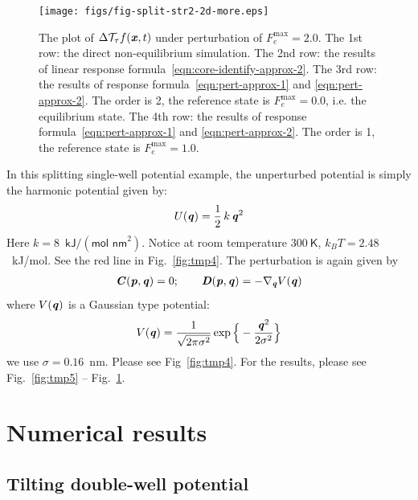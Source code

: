 \documentclass[aip,jcp,a4paper,reprint,onecolumn]{revtex4-1}
\newcommand{\vect}[1]{\textbf{\textit{#1}}}
\newcommand{\mt}{\mathcal T}
\begin{document}
\begin{figure}
  \centering
  \texttt{[image: figs/fig-split-str2-2d-more.eps]}
  \caption{The plot of $\Delta\mt_\tau f(\vect x,t)$  under perturbation of
    $F_e^{\textrm{max}} = 2.0$.
    The 1st row: the direct non-equilibrium
    simulation. The 2nd row: the results of linear response
    formula~\eqref{eqn:core-identify-approx-2}.
    The 3rd row: the results of response
    formula~\eqref{eqn:pert-approx-1} and \eqref{eqn:pert-approx-2}.
    The order is 2, the reference state is $F_e^{\textrm{max}} = 0.0$, i.e.
    the equilibrium state.
    The 4th row: the results of response
    formula~\eqref{eqn:pert-approx-1} and \eqref{eqn:pert-approx-2}.
    The order is 1, the reference state is $F_e^{\textrm{max}} = 1.0$.
  }
  \label{fig:tmp6}
\end{figure}


In this splitting single-well potential example, the unperturbed
potential is simply the harmonic potential given by:
\begin{align}
  U(\vect q) = \frac12\,k\,\vect q^2 
\end{align}
Here $k = 8$~$\textsf{kJ} / (\textsf{mol nm}^2)$.
Notice at room temperature $300\ \textsf{K}$, $k_BT = 2.48$~\textsf{kJ/mol}.
See the red line in Fig.~\ref{fig:tmp4}.
The perturbation is again given by
\begin{align}
  \vect C(\vect p, \vect q) = 0; \qquad
  \vect D(\vect p, \vect q) = -\nabla_{\vect q} V(\vect q) 
\end{align}
where $V(\vect q)$ is a Gaussian type potential:
\begin{align}
  V(\vect q) = \frac{1}{\sqrt{2\pi \sigma^2}}
  \exp\Big\{-\frac{\vect q^2}{2\sigma^2}\Big\}
\end{align}
we use $\sigma = 0.16$~\textsf{nm}. Please see Fig~\ref{fig:tmp4}.
For the results, please see Fig.~\ref{fig:tmp5} -- Fig.~\ref{fig:tmp6}.









\newpage
\section{Numerical results}
\subsection{Tilting double-well potential}
\end{document}
